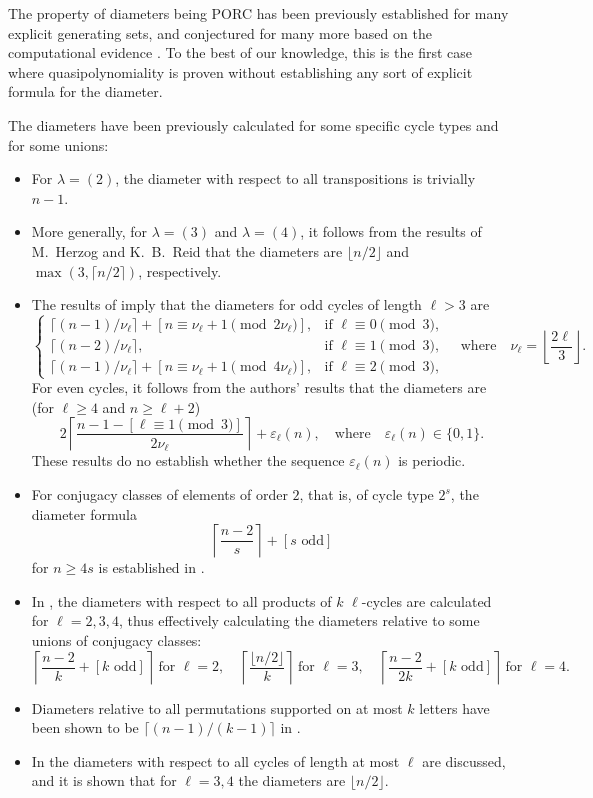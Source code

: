 \documentclass[DIV=12,10pt]{scrartcl}
\theoremstyle{definition}
\begin{document}
The property of diameters being PORC has been previously established for many explicit generating sets, and conjectured for many more based on the computational evidence \cite{CayleyPyGrowth}. To the best of our knowledge, this is the first case where quasipolynomiality is proven without establishing any sort of explicit formula for the diameter.

The diameters have been previously calculated for some specific cycle types and for some unions:
\begin{itemize}
\item For $\lambda=(2)$, the diameter with respect to all transpositions is trivially $n-1$.
\item More generally, for $\lambda=(3)$ and $\lambda=(4)$, it follows from the results of M.~Herzog and K.~B.~Reid \cite{HerzogReidCycles} that the diameters are $\lfloor n/2\rfloor$ and $\max(3, \lceil n/2\rceil)$, respectively.
\item The results of \cite{ProductsOfCycleClassesI,ProductsOfCycleClassesII} imply that the diameters for odd cycles of length $\ell>3$ are
\[
	\begin{cases}
		\lceil (n-1)/\nu_\ell\rceil + [n\equiv \nu_\ell+1 \pmod{2\nu_\ell}], & \text{if } \ell\equiv 0 \pmod{3}, \\
		\lceil (n-2)/\nu_\ell\rceil, & \text{if } \ell\equiv 1\pmod{3}, \\
		\lceil (n-1)/\nu_\ell\rceil + [n\equiv \nu_\ell+1 \pmod{4\nu_\ell}], & \text{if } \ell\equiv 2 \pmod{3},
	\end{cases}
	\quad\text{where}\quad
	\nu_\ell = \left\lfloor \frac{2\ell}{3} \right\rfloor.
\]
For even cycles, it follows from the authors' results that the diameters are (for $\ell\geqslant 4$ and $n\geqslant\ell+2$)
\[
	2\left\lceil \frac{n-1-[\ell\equiv 1\pmod{3}]}{2\nu_\ell} \right\rceil + \varepsilon_\ell(n),
	\quad\text{where}\quad
	\varepsilon_\ell(n) \in \{0,1\}.
\]
These results do no establish whether the sequence $\varepsilon_\ell(n)$ is periodic.
\item For conjugacy classes of elements of order $2$, that is, of cycle type $2^s$, the diameter formula
\[
	\left\lceil \frac{n-2}{s} \right\rceil + [\text{$s$ odd}]
\]
for $n\geqslant 4s$ is established in \cite{PhongpattanacharoenSiemons}.
\item In \cite{KMCycles}, the diameters with respect to all products of $k$ $\ell$-cycles are calculated for $\ell=2,3,4$, thus effectively calculating the diameters relative to some unions of conjugacy classes:
\[
	\left\lceil \frac{n-2}{k} + [\text{$k$ odd}] \right\rceil\ \text{for $\ell=2$}, \quad
	\left\lceil \frac{\lfloor n/2\rfloor}{k} \right\rceil\ \text{for $\ell=3$}, \quad
	\left\lceil \frac{n-2}{2k} + [\text{$k$ odd}] \right\rceil\ \text{for $\ell=4$}.
\]
\item Diameters relative to all permutations supported on at most $k$ letters have been shown to be $\lceil (n-1)/(k-1) \rceil$ in \cite[Lemma~14]{Mastermind}.
\item In \cite{CicirelloCycleMutation} the diameters with respect to all cycles of length at most $\ell$ are discussed, and it is shown that for $\ell=3,4$ the diameters are $\lfloor n/2\rfloor$.
\end{itemize}
\end{document}
